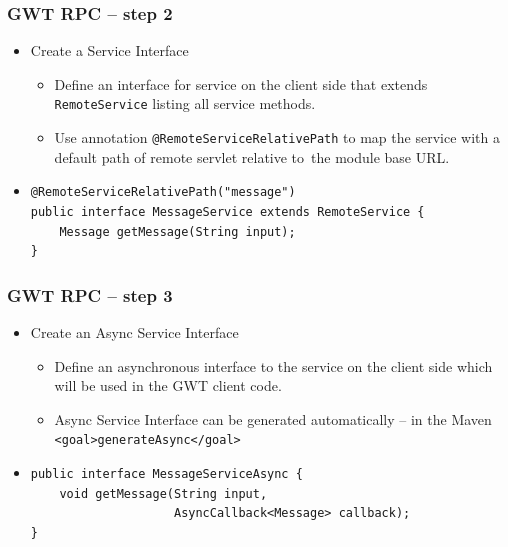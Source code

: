 \documentclass[10pt,table, xcolor=pdflatex]{beamer}
\begin{document}
\begin{frame}[fragile]\frametitle{GWT RPC -- step 2}
	\begin{itemize}
		\item Create a Service Interface
          \begin{itemize}
        	\item Define an interface for service on the client side that extends \texttt{RemoteService} listing all service methods.
        	\item Use annotation \texttt{@RemoteServiceRelativePath} to map the service with a default path of remote servlet relative to~the module base URL.
          \end{itemize}
        \medskip
        \item[]
        	\lstset{language=Java, basicstyle=\footnotesize\ttfamily}
			\begin{lstlisting}
@RemoteServiceRelativePath("message")
public interface MessageService extends RemoteService {
    Message getMessage(String input);
}
			\end{lstlisting}
	\end{itemize}
\end{frame}


\begin{frame}[fragile]\frametitle{GWT RPC -- step 3}
	\begin{itemize}
		\item {Create an Async Service Interface}
          \begin{itemize}
			\item Define an asynchronous interface to the service on the client side which will be used in the GWT client code.
            \item Async Service Interface can be generated automatically -- in the Maven \texttt{<goal>generateAsync</goal>}
          \end{itemize}
		\item[]
        	\lstset{language=Java, basicstyle=\footnotesize\ttfamily}
            \begin{lstlisting}
public interface MessageServiceAsync {
    void getMessage(String input, 
                    AsyncCallback<Message> callback);
}
            \end{lstlisting}
	\end{itemize}
\end{frame}
\end{document}
